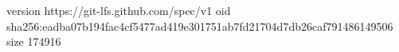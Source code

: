 version https://git-lfs.github.com/spec/v1
oid sha256:eadba07b194fac4cf5477ad419e301751ab7fd21704d7db26caf791486149506
size 174916
